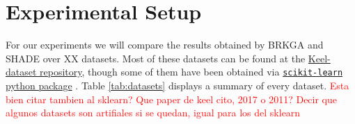 \documentclass[review]{elsarticle}
\begin{document}
\clearpage

\section{Experimental Setup}

For our experiments we will compare the results obtained by BRKGA and SHADE over XX datasets. Most of these datasets can be found at the \href{https://sci2s.ugr.es/keel/category.php?cat=clas}{Keel-dataset repository}\cite{triguero2017keel}, though some of them have been obtained via
\href{https://scikit-learn.org/stable/datasets/index.html}{\texttt{scikit-learn} python package} \cite{scikit-learn}. Table \ref{tab:datasets} displays a summary of every dataset. \textcolor{red}{Esta bien citar tambien al sklearn? Que paper de keel cito, 2017 o 2011? Decir que algunos datasets son artifiales si se quedan, igual para los del sklearn}
\end{document}
